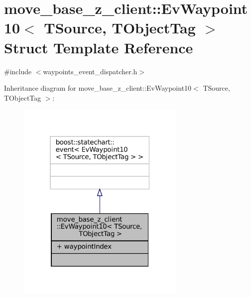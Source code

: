 \hypertarget{structmove__base__z__client_1_1EvWaypoint10}{}\section{move\+\_\+base\+\_\+z\+\_\+client\+:\+:Ev\+Waypoint10$<$ T\+Source, T\+Object\+Tag $>$ Struct Template Reference}
\label{structmove__base__z__client_1_1EvWaypoint10}


{\ttfamily \#include $<$waypoints\+\_\+event\+\_\+dispatcher.\+h$>$}



Inheritance diagram for move\+\_\+base\+\_\+z\+\_\+client\+:\+:Ev\+Waypoint10$<$ T\+Source, T\+Object\+Tag $>$\+:
\nopagebreak
\begin{figure}[H]
\begin{center}
\leavevmode
\includegraphics[width=229pt]{structmove__base__z__client_1_1EvWaypoint10__inherit__graph}
\end{center}
\end{figure}


